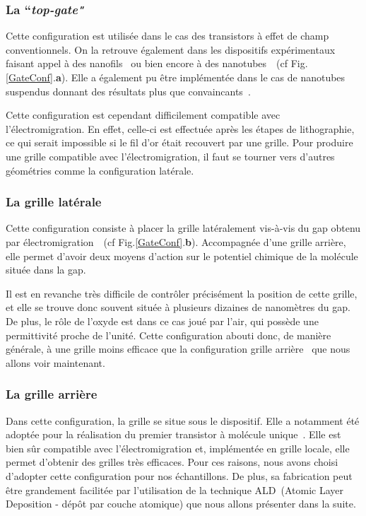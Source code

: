 \subsubsection{La ``\textit{top-gate"}}
Cette configuration est utilisée dans le cas des transistors à effet de champ conventionnels. On la retrouve également dans les dispositifs expérimentaux faisant appel à des nanofils~\cite{Fasth2005} ou bien encore à des nanotubes~\cite{Javey2002}~(cf Fig.\ref{GateConf}.\textbf{a}). Elle a également pu être implémentée dans le cas de nanotubes suspendus donnant des résultats plus que convaincants~\cite{Leturcq2009}.

Cette configuration est cependant difficilement compatible avec l'électromigration. En effet, celle-ci est effectuée après les étapes de lithographie, ce qui serait impossible si le fil d'or était recouvert par une grille. Pour produire une grille compatible avec l'électromigration, il faut se tourner vers d'autres géométries comme la configuration latérale.

\subsubsection{La grille latérale}
Cette configuration consiste à placer la grille latéralement vis-à-vis du gap obtenu par électromigration~\cite{Mangin2009}~(cf Fig.\ref{GateConf}.\textbf{b}). Accompagnée d'une grille arrière, elle permet d'avoir deux moyens d'action sur le potentiel chimique de la molécule située dans la gap. 

Il est en revanche très difficile de contr\^oler précisément la position de cette grille, et elle se trouve donc souvent située à plusieurs dizaines de nanomètres du gap. De plus, le r\^ole de l'oxyde est dans ce cas joué par l'air, qui possède une permittivité proche de l'unité. Cette configuration abouti donc, de manière générale, à une grille moins efficace que la configuration grille arrière~\cite{Aurore2009} que nous allons voir maintenant.


\subsubsection{La grille arrière}
Dans cette configuration, la grille se situe sous le dispositif. Elle a notamment été adoptée pour la réalisation du premier transistor à molécule unique~\cite{Park2000}. Elle est bien s\^ur compatible avec l'électromigration et, implémentée en grille locale, elle permet d'obtenir des grilles très efficaces. Pour ces raisons, nous avons choisi d’adopter cette configuration pour nos échantillons. De plus, sa fabrication peut \^etre grandement facilitée par l'utilisation de la technique ALD~(Atomic Layer Deposition - dép\^ot par couche atomique) que nous allons présenter dans la suite.



